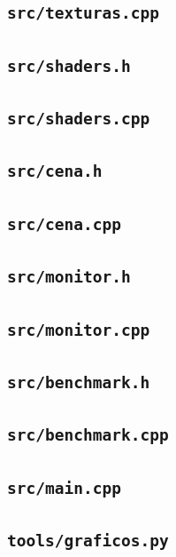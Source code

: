 \documentclass[12pt,a4paper]{article}
\begin{document}
\subsection*{\texttt{src/texturas.cpp}}


\subsection*{\texttt{src/shaders.h}}


\subsection*{\texttt{src/shaders.cpp}}


\subsection*{\texttt{src/cena.h}}


\subsection*{\texttt{src/cena.cpp}}


\subsection*{\texttt{src/monitor.h}}


\subsection*{\texttt{src/monitor.cpp}}


\subsection*{\texttt{src/benchmark.h}}


\subsection*{\texttt{src/benchmark.cpp}}


\subsection*{\texttt{src/main.cpp}}


\subsection*{\texttt{tools/graficos.py}}

\end{document}
